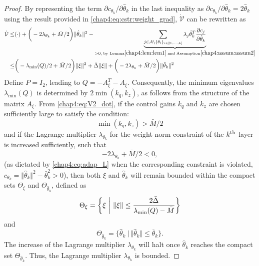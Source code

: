 \begin{proof}
By representing the term $\partial c_{\theta_k}/\partial \hat\theta_k$ in the last inequality as $\partial c_{\theta_k}/\partial \hat\theta_k=2\hat\theta_k$ using the result provided in \eqref{chap4:eq:cstr:weight_grad}, $\dot {\mathcal V}$ can be rewritten as
\begin{equation}
    \begin{aligned}
        \dot {\mathcal V} \le&
        (\cdot) + 
        \bigg(
            -2\lambda _{\theta_k}+{\bar M}/{2}
        \bigg)
        \Vert\hat\theta_k\Vert^2 
        - \underbrace{
        \sum_{j\in\mathcal{A}\setminus \{\theta_i\}_{i\in[0,\cdots,k]}}\lambda_j\hat\theta_k^T{\partial c_j\over\partial \hat\theta_k}
        }_{>0, \text{\;by Lemma} \ref{chap4:lem:lem1} \text{\;and\;} \text{Assumption} \ref{chap4:assum:assum2}}	
        \\
        \le&
        \bigg(
            -{\lambda_\text{min}(Q)}/{2}+{\bar M}/{2}
        \bigg)
        \Vert\xi\Vert^2
        +\bar \Delta \Vert \xi\Vert 
        + 
        \bigg(
            -2\lambda _{\theta_k}+{\bar M}/{2}
        \bigg)
        \Vert\hat\theta_k\Vert^2 
    \end{aligned}
    \label{chap4:eq:V2_dot}
\end{equation}
Define $P=I_2$, leading to $Q = -A_{\xi}^T - A_{\xi}$. Consequently, the minimum eigenvalues ${\lambda_{\text{min}}(Q)}$ is determined by $2\min({k_q},{k_z})$, as follows from the structure of the matrix $A_{\xi}$. From \eqref{chap4:eq:V2_dot}, if the control gains ${k_q}$ and ${k_z}$ are chosen sufficiently large to satisfy the condition:
\begin{equation}
    \min({k_q},{k_z})>\bar M/2
    \label{chap4:eq:stable_cond}
\end{equation}
and if the Lagrange multiplier $\lambda_{\theta_k}$ for the weight norm constraint of the $k\textsuperscript{th}$ layer is increased sufficiently, such that
\begin{equation}
    -2\lambda_{\theta_k} +{\bar M/ 2}<0,  
\end{equation}
(as dictated by \eqref{chap4:eq:adap_L} when the corresponding constraint is violated, \ie $c_{\theta_k}=\Vert \hat\theta_k\Vert^2 -\bar\theta_k^2 > 0$), then both $\xi$ and $\hat\theta_k$ will remain bounded within the compact sets $\Theta_\xi$ and $\Theta_{\hat\theta_k}$, defined as
\begin{equation}
    \Theta_\xi = 
    \bigg\{ \xi \ \bigg\vert\ \Vert\xi\Vert \le  
    {2\bar \Delta\over \lambda _\text{min}(Q)-\bar M} 
    \bigg\}
\end{equation}
and
\begin{equation}
    \Theta_{\hat\theta_k} = 
    \{
    \hat\theta_k 
    \ 
    \vert
    \ 
    \Vert
    \hat\theta_k\Vert \le  
    \bar\theta_k
    \}
    .
\end{equation}
The increase of the Lagrange multiplier $\lambda_{\theta_k}$ will halt once $\hat \theta_k$ reaches the compact set $\Theta_{\hat\theta_k}$. Thus, the Lagrange multiplier $\lambda_{\theta_k}$ is bounded.


\end{proof}
